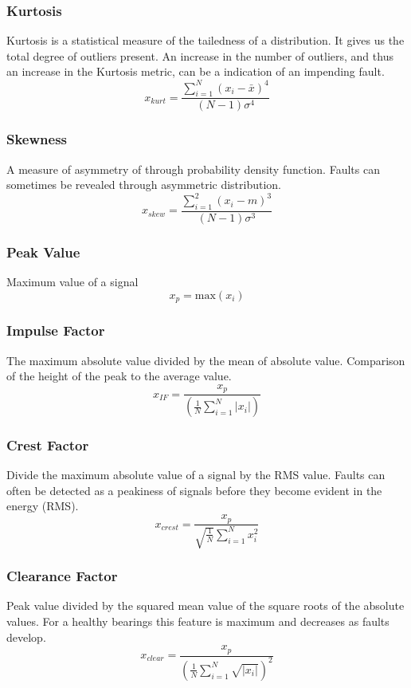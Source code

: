 \documentclass[]{article}
\begin{document}
\subsubsection*{Kurtosis}
Kurtosis is a statistical measure of the tailedness of a distribution. It gives us the total degree of outliers present. An increase in the number of outliers, and thus an increase in the Kurtosis metric, can be a indication of an impending fault.
\begin{equation}
x_{kurt} = \frac{\sum^N_{i=1}(x_i-\bar{x})^4}{(N-1)\sigma^4}
\end{equation}
\subsubsection*{Skewness} 
A measure of asymmetry of through probability density function. Faults can sometimes be revealed through asymmetric distribution.
\begin{equation}
x_{skew} = \frac{\sum^2_{i=1}(x_i-m)^3}{(N-1)\sigma^3}
\end{equation}
\subsubsection*{Peak Value}
Maximum value of a signal
\begin{equation}
x_p = \textrm{max}(x_i)
\end{equation}
\subsubsection*{Impulse Factor} 
The maximum absolute value divided by the mean of absolute value. Comparison of the height of the peak to the average value.
\begin{equation}
x_{IF} = \frac{x_p}{(\frac{1}{N}\sum^N_{i=1}|x_i|)}
\end{equation}
\subsubsection*{Crest Factor} 
Divide the maximum absolute value of a signal by the \gls{RMS} value.
Faults can often be detected as a peakiness of signals before they become evident in the energy (\gls{RMS}).
\begin{equation}
x_{crest} = \frac{x_p}{\sqrt{\frac{1}{N}}\sum^N_{i=1}x^2_i}
\end{equation}
\subsubsection*{Clearance Factor} 
Peak value divided by the squared mean value of the square roots of the absolute values. For a healthy bearings this feature is maximum and decreases as faults develop.
\begin{equation}
x_{clear} = \frac{x_p}{(\frac{1}{N}\sum^N_{i=1}\sqrt{|x_i|})^2}
\end{equation}
\end{document}

